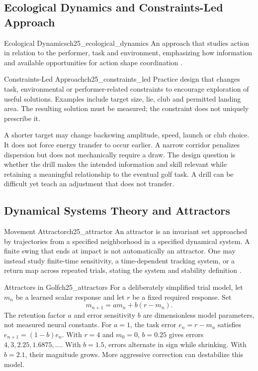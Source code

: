 \subsection{Ecological Dynamics and Constraints-Led Approach}
\label{subsec:ch25_ecological}

\begin{definition}{Ecological Dynamics}{ch25_ecological_dynamics}
An approach that studies action in relation to the performer, task and environment, emphasizing how information and available opportunities for action shape coordination \citep{davids2008dynamics}.
\end{definition}

\begin{definition}{Constraints-Led Approach}{ch25_constraints_led}
Practice design that changes task, environmental or performer-related constraints to encourage exploration of useful solutions. Examples include target size, lie, club and permitted landing area. The resulting solution must be measured; the constraint does not uniquely prescribe it.
\end{definition}

A shorter target may change backswing amplitude, speed, launch or club choice. It does not force energy transfer to occur earlier. A narrow corridor penalizes dispersion but does not mechanically require a draw. The design question is whether the drill makes the intended information and skill relevant while retaining a meaningful relationship to the eventual golf task. A drill can be difficult yet teach an adjustment that does not transfer.

\subsection{Dynamical Systems Theory and Attractors}
\label{subsec:ch25_dynamical_systems}

\begin{definition}{Movement Attractor}{ch25_attractor}
An attractor is an invariant set approached by trajectories from a specified neighborhood in a specified dynamical system. A finite swing that ends at impact is not automatically an attractor. One may instead study finite-time sensitivity, a time-dependent tracking system, or a return map across repeated trials, stating the system and stability definition \citep{kelso1995dynamic}.
\end{definition}

\begin{example}{Attractors in Golf}{ch25_attractors}
For a deliberately simplified trial model, let $m_n$ be a learned scalar response and let $r$ be a fixed required response. Set
\[
m_{n+1}=a m_n+b(r-m_n).
\]
The retention factor $a$ and error sensitivity $b$ are dimensionless model parameters, not measured neural constants. For $a=1$, the task error $e_n=r-m_n$ satisfies $e_{n+1}=(1-b)e_n$. With $r=4$ and $m_0=0$, $b=0.25$ gives errors $4,3,2.25,1.6875,\ldots$. With $b=1.5$, errors alternate in sign while shrinking. With $b=2.1$, their magnitude grows. More aggressive correction can destabilize this model.
\end{example}

